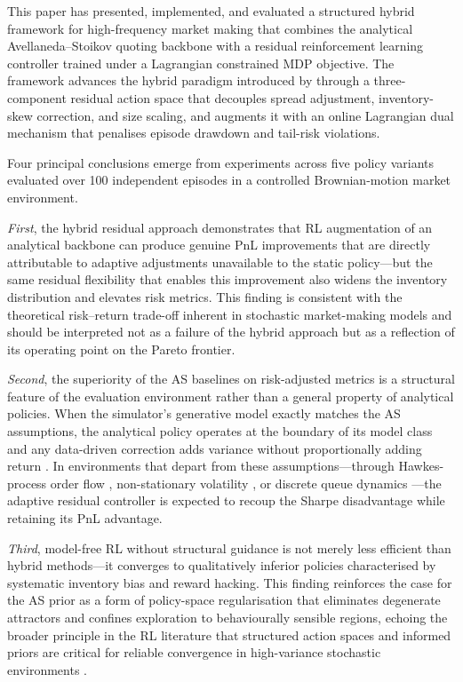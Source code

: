 \documentclass[11pt]{article}
\begin{document}
This paper has presented, implemented, and evaluated a structured hybrid
framework for high-frequency market making that combines the analytical
Avellaneda--Stoikov quoting backbone with a residual reinforcement
learning controller trained under a Lagrangian constrained MDP objective.
The framework advances the hybrid paradigm introduced by
\textcite{falces2022asrl} through a three-component residual action space
that decouples spread adjustment, inventory-skew correction, and size
scaling, and augments it with an online Lagrangian dual mechanism that
penalises episode drawdown and tail-risk violations.

Four principal conclusions emerge from experiments across five policy
variants evaluated over 100 independent episodes in a controlled
Brownian-motion market environment.

\textit{First}, the hybrid residual approach demonstrates that RL
augmentation of an analytical backbone can produce genuine PnL
improvements that are directly attributable to adaptive adjustments
unavailable to the static policy---but the same residual flexibility
that enables this improvement also widens the inventory distribution and
elevates risk metrics.
This finding is consistent with the theoretical risk--return trade-off
inherent in stochastic market-making models
\parencite{ho1981dealer,cartea2015ahft} and should be interpreted not as
a failure of the hybrid approach but as a reflection of its operating point
on the Pareto frontier.

\textit{Second}, the superiority of the AS baselines on risk-adjusted
metrics is a structural feature of the evaluation environment rather than
a general property of analytical policies.
When the simulator's generative model exactly matches the AS assumptions,
the analytical policy operates at the boundary of its model class and
any data-driven correction adds variance without proportionally adding
return \parencite{avellaneda2008hftlob,gueant2013inventory}.
In environments that depart from these assumptions---through Hawkes-process
order flow \parencite{gasperov2022hawkesmm}, non-stationary volatility
\parencite{lalor2025nonmarkov}, or discrete queue dynamics
\parencite{cont2013markovlob}---the adaptive residual controller is
expected to recoup the Sharpe disadvantage while retaining its PnL advantage.

\textit{Third}, model-free RL without structural guidance is not merely
less efficient than hybrid methods---it converges to qualitatively inferior
policies characterised by systematic inventory bias and reward hacking.
This finding reinforces the case for the AS prior as a form of
policy-space regularisation that eliminates degenerate attractors and
confines exploration to behaviourally sensible regions, echoing the
broader principle in the RL literature that structured action spaces and
informed priors are critical for reliable convergence in high-variance
stochastic environments \parencite{spooner2018mmrl,gasperov2021rlmm}.
\end{document}
